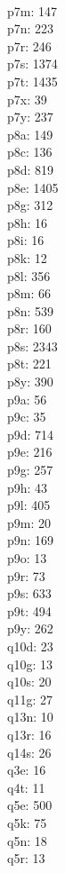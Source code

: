 \begin{multicols}{8}
  \\ p7m: 147
  \\ p7n: 223
  \\ p7r: 246
  \\ p7s: 1374
  \\ p7t: 1435
  \\ p7x: 39
  \\ p7y: 237
  \\ p8a: 149
  \\ p8c: 136
  \\ p8d: 819
  \\ p8e: 1405
  \\ p8g: 312
  \\ p8h: 16
  \\ p8i: 16
  \\ p8k: 12
  \\ p8l: 356
  \\ p8m: 66
  \\ p8n: 539
  \\ p8r: 160
  \\ p8s: 2343
  \\ p8t: 221
  \\ p8y: 390
  \\ p9a: 56
  \\ p9c: 35
  \\ p9d: 714
  \\ p9e: 216
  \\ p9g: 257
  \\ p9h: 43
  \\ p9l: 405
  \\ p9m: 20
  \\ p9n: 169
  \\ p9o: 13
  \\ p9r: 73
  \\ p9s: 633
  \\ p9t: 494
  \\ p9y: 262
  \\ q10d: 23
  \\ q10g: 13
  \\ q10s: 20
  \\ q11g: 27
  \\ q13n: 10
  \\ q13r: 16
  \\ q14s: 26
  \\ q3e: 16
  \\ q4t: 11
  \\ q5e: 500
  \\ q5k: 75
  \\ q5n: 18
  \\ q5r: 13

\end{multicols}
